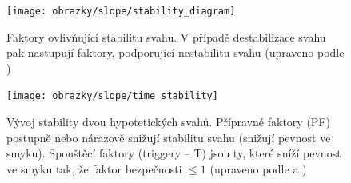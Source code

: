 \begin{figure}[h]
	\centering
	\texttt{[image: obrazky/slope/stability\_diagram]}
	\caption{Faktory ovlivňující stabilitu svahu. V případě destabilizace svahu pak nastupují faktory, podporující nestabilitu svahu (upraveno podle \textcite{gladeLandslideGeomorphologyChanging2010})}
	\label{fig:stability_diagram}
\end{figure}

\begin{figure}[h]
	\centering
	\texttt{[image: obrazky/slope/time\_stability]}
	\caption{Vývoj stability dvou hypotetických svahů. Přípravné faktory (PF) postupně nebo nárazově snižují stabilitu svahu (snižují pevnost ve smyku). Spouštěcí faktory (triggery -- T) jsou ty, které sníží pevnost ve smyku tak, že faktor bezpečnosti $ \leq 1$ (upraveno podle \textcite{popescuSuggestedMethodReporting1994} a \textcite{mccollLandslideCausesTriggers2015})}
	\label{fig:timestability}
\end{figure}

